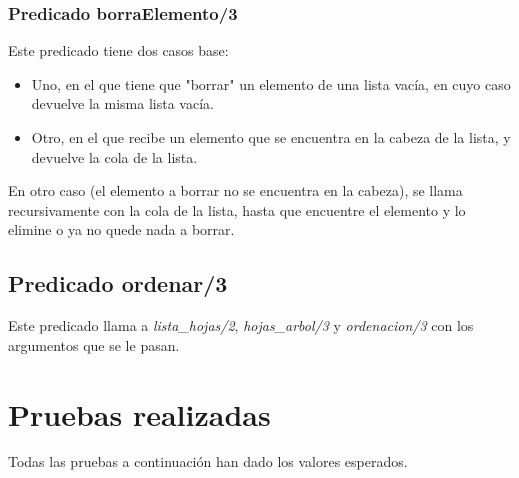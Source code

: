 \documentclass[12pt, a4paper, spanish]{article}
\begin{document}
\subsubsection{Predicado borraElemento/3}


Este predicado tiene dos casos base:

\begin{itemize}
	\item Uno, en el que tiene que "borrar" un elemento de una lista vacía, en cuyo caso devuelve la misma lista vacía.
	
	\item Otro, en el que recibe un elemento que se encuentra en la cabeza de la lista, y devuelve la cola de la lista.
\end{itemize}

En otro caso (el elemento a borrar no se encuentra en la cabeza), se llama recursivamente con la cola de la lista, hasta que encuentre el elemento y lo elimine o ya no quede nada a borrar.

\subsection{Predicado ordenar/3}


Este predicado llama a \textit{lista\_hojas/2}, \textit{hojas\_arbol/3} y \textit{ordenacion/3} con los argumentos que se le pasan.
\newpage

\section{Pruebas realizadas}

Todas las pruebas a continuación han dado los valores esperados.
\end{document}

